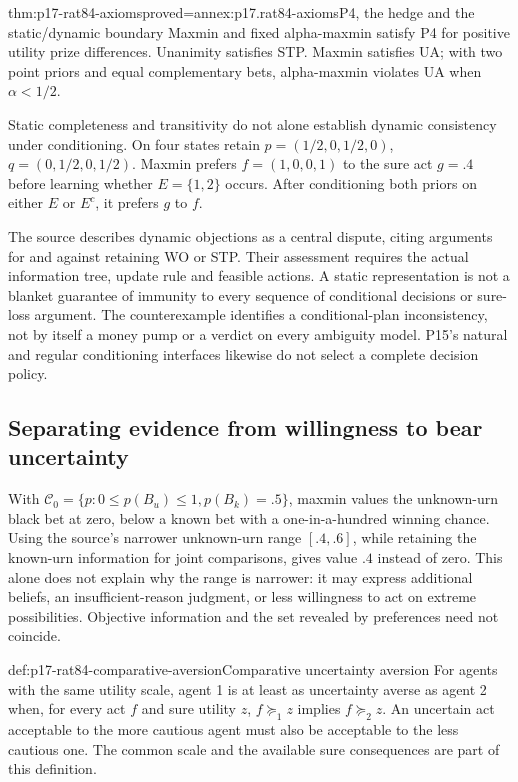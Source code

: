 \begin{hblemma}{thm:p17-rat84-axioms}{proved=annex:p17.rat84-axioms}{P4, the hedge and the static/dynamic boundary}
Maxmin and fixed alpha-maxmin satisfy P4 for positive utility prize
differences. Unanimity satisfies STP. Maxmin satisfies UA; with
two point priors and equal complementary bets, alpha-maxmin violates
UA when \(\alpha<1/2\).

Static completeness and transitivity do not alone establish dynamic
consistency under conditioning. On four states retain
\(p=(1/2,0,1/2,0)\), \(q=(0,1/2,0,1/2)\).
Maxmin prefers \(f=(1,0,0,1)\) to the sure act \(g=.4\) before
learning whether \(E=\{1,2\}\) occurs. After conditioning both
priors on either \(E\) or \(E^c\), it prefers \(g\) to \(f\).
\end{hblemma}

The source describes dynamic objections as a central dispute, citing
arguments for and against retaining WO or STP. Their assessment requires
the actual information tree, update rule and feasible actions. A static
representation is not a blanket guarantee of immunity to every sequence
of conditional decisions or sure-loss argument. The counterexample
identifies a conditional-plan inconsistency, not by itself a money pump
or a verdict on every ambiguity model. P15's natural and regular
conditioning interfaces likewise do not select a complete decision policy.

\subsection{Separating evidence from willingness to bear uncertainty}
\label{sec:p17-rat84-belief-taste}

With \(\mathcal C_0=\{p:0\leq p(B_u)\leq1,p(B_k)=.5\}\),
maxmin values the unknown-urn black bet at zero, below a known bet
with a one-in-a-hundred winning chance. Using the source's narrower
unknown-urn range \([.4,.6]\), while retaining the known-urn information
for joint comparisons, gives value \(.4\) instead of zero.
This alone does not explain why the range is narrower: it may express
additional beliefs, an insufficient-reason judgment, or less willingness
to act on extreme possibilities. Objective information and the set
revealed by preferences need not coincide.

\begin{hbdefinition}{def:p17-rat84-comparative-aversion}{Comparative uncertainty aversion}
For agents with the same utility scale, agent 1 is at least as
uncertainty averse as agent 2 when, for every act \(f\) and sure
utility \(z\), \(f\succeq_1 z\) implies \(f\succeq_2 z\).
An uncertain act acceptable to the more cautious agent must also
be acceptable to the less cautious one. The common scale and the
available sure consequences are part of this definition.
\end{hbdefinition}

